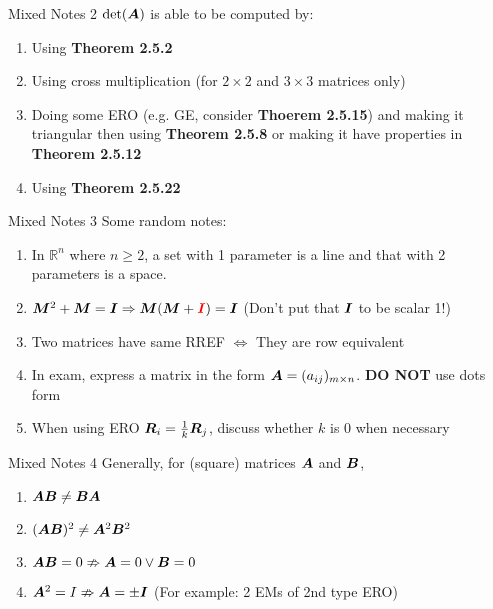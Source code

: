 \documentclass[10pt,portrait]{article}
\begin{document}
\begin{multicols}{2}
\begin{justifying}
\begin{namedthm*}{Mixed Notes 2}
	\(\det(\bm{A})\) is able to be computed by:
	\begin{enumerate}
		\item Using \textbf{Theorem 2.5.2}
		\item Using cross multiplication (for \(2 \times 2\) and \(3 \times 3\) matrices only)
		\item Doing some ERO (e.g. GE, consider \textbf{Thoerem 2.5.15}) and making it triangular  then using \textbf{Theorem 2.5.8} or making it have properties in \textbf{Theorem 2.5.12}
		\item Using \textbf{Theorem 2.5.22}
	\end{enumerate} 
\end{namedthm*}

\begin{namedthm*}{Mixed Notes 3}
	Some random notes:
	\begin{enumerate}
		\item In \(\mathbb{R}^n\) where \(n \ge 2\), a set with 1 parameter is a line and that with 2 parameters is a space.
		\item \(\bm{M}^2 + \bm{M} = \bm{I} \Rightarrow \bm{M}(\bm{M} + \textcolor{red}{\bm{I}}) = \bm{I}\) (Don't put that \(\bm{I}\) to be scalar 1!)
		\item Two matrices have same RREF \(\Leftrightarrow\) They are row equivalent
		\item In exam, express a matrix in the form \(\bm{A} = (a_{ij})_{m \times n}\). \textbf{DO NOT} use dots form
		\item When using ERO \(\bm{R}_i = \frac{1}{k}\bm{R}_j\), discuss whether \(k\) is 0 when necessary
	\end{enumerate}
\end{namedthm*}

\begin{namedthm*}{Mixed Notes 4}
	Generally, for (square) matrices \(\bm{A}\) and \(\bm{B}\),
	\begin{enumerate}
		\item \(\bm{AB} \ne \bm{BA}\)
		\item \((\bm{AB})^2 \ne \bm{A}^2\bm{B}^2\)
		\item \(\bm{AB} = 0 \nRightarrow \bm{A} = 0 \lor \bm{B} = 0\)
		\item \(\bm{A}^2 = I \nRightarrow \bm{A} = \pm \bm{I}\) (For example: 2 EMs of 2nd type ERO)
	\end{enumerate}
\end{namedthm*}


\end{justifying}
\end{multicols}
\end{document}
